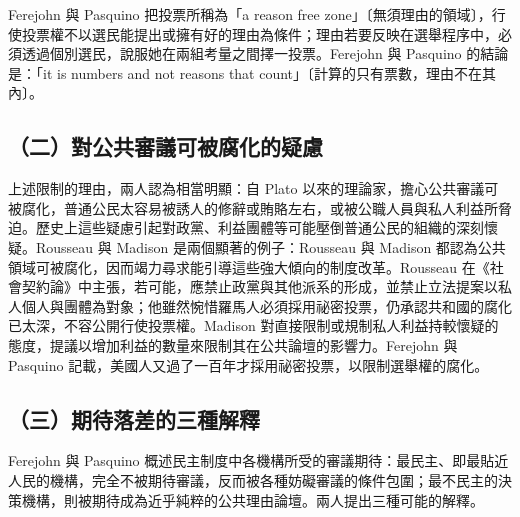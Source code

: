 Ferejohn 與 Pasquino 把投票所稱為「a reason free zone」〔無須理由的領域〕，行使投票權不以選民能提出或擁有好的理由為條件；理由若要反映在選舉程序中，必須透過個別選民，說服她在兩組考量之間擇一投票。Ferejohn 與 Pasquino 的結論是：「it is numbers and not reasons that count」〔計算的只有票數，理由不在其內〕。

\subsection{（二）對公共審議可被腐化的疑慮}

上述限制的理由，兩人認為相當明顯：自 Plato 以來的理論家，擔心公共審議可被腐化，普通公民太容易被誘人的修辭或賄賂左右，或被公職人員與私人利益所脅迫。歷史上這些疑慮引起對政黨、利益團體等可能壓倒普通公民的組織的深刻懷疑。Rousseau 與 Madison 是兩個顯著的例子：Rousseau 與 Madison 都認為公共領域可被腐化，因而竭力尋求能引導這些強大傾向的制度改革。Rousseau 在《社會契約論》中主張，若可能，應禁止政黨與其他派系的形成，並禁止立法提案以私人個人與團體為對象；他雖然惋惜羅馬人必須採用祕密投票，仍承認共和國的腐化已太深，不容公開行使投票權。Madison 對直接限制或規制私人利益持較懷疑的態度，提議以增加利益的數量來限制其在公共論壇的影響力。Ferejohn 與 Pasquino 記載，美國人又過了一百年才採用祕密投票，以限制選舉權的腐化。

\subsection{（三）期待落差的三種解釋}

Ferejohn 與 Pasquino 概述民主制度中各機構所受的審議期待：最民主、即最貼近人民的機構，完全不被期待審議，反而被各種妨礙審議的條件包圍；最不民主的決策機構，則被期待成為近乎純粹的公共理由論壇。兩人提出三種可能的解釋。

